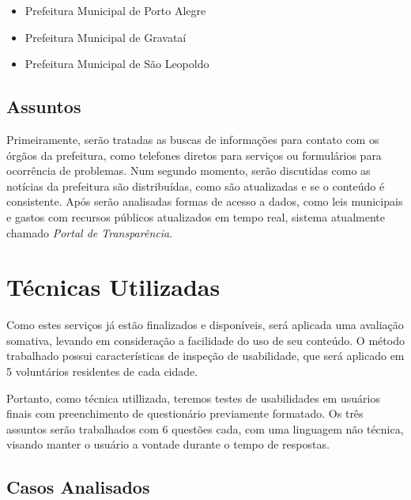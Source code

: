\documentclass{article}
\begin{document}
\begin{itemize}
  \item Prefeitura Municipal de Porto Alegre
  \item Prefeitura Municipal de Gravataí
  \item Prefeitura Municipal de São Leopoldo
\end{itemize}

\subsection{Assuntos}

Primeiramente, serão tratadas as buscas de informações para contato com os
órgãos da prefeitura, como telefones diretos para serviços ou formulários para
ocorrência de problemas. Num segundo momento, serão discutidas como as notícias
da prefeitura são distribuídas, como são atualizadas e se o conteúdo é
consistente. Após serão analisadas formas de acesso a dados, como leis 
municipais e gastos com recursos públicos atualizados em tempo real, sistema
atualmente chamado \textit{Portal de Transparência}.

\section{Técnicas Utilizadas}

Como estes serviços já estão finalizados e disponíveis, será aplicada uma
avaliação somativa, levando em consideração a facilidade do uso de seu conteúdo.
O método trabalhado possui características de inspeção de usabilidade, que será
aplicado em 5 voluntários residentes de cada cidade.

Portanto, como técnica utillizada, teremos testes de usabilidades em usuários
finais com preenchimento de questionário previamente formatado. Os três assuntos
serão trabalhados com 6 questões cada, com uma linguagem não técnica, visando
manter o usuário a vontade durante o tempo de respostas.

\subsection{Casos Analisados}
\end{document}
